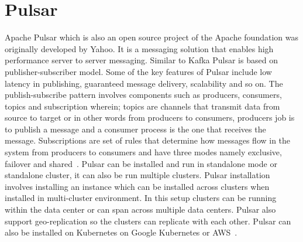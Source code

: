 \section{Pulsar}

Apache Pulsar which is also an open source project of the Apache 
foundation was originally developed by Yahoo. It is a messaging 
solution that enables high performance server to server messaging. 
Similar to Kafka Pulsar is based on publisher-subscriber model. 
Some of the key features of Pulsar include low latency in 
publishing, guaranteed message delivery, scalability and so on. 
The publish-subscribe pattern involves components such as 
producers, consumers, topics and subscription wherein; topics 
are channels that transmit data from source to target or in other 
words from producers to consumers, producers job is to publish a 
message and a consumer process is the one that receives the message. 
Subscriptions are set of rules that determine how messages flow in 
the system from producers to consumers and have three modes namely 
exclusive, failover and shared~\cite{hid-sp18-517-pulsar-apache}.
Pulsar can be installed and run in standalone mode or standalone 
cluster, it can also be run multiple clusters. Pulsar installation 
involves installing an instance which can be installed across clusters
when installed in multi-cluster environment. In this setup clusters can
be running within the data center or can span across multiple data centers.
Pulsar also support geo-replication so the clusters can replicate with each 
other. Pulsar can also be installed on Kubernetes on Google Kubernetes or 
AWS~\cite{hid-sp18-517-pulsar-apache}.
